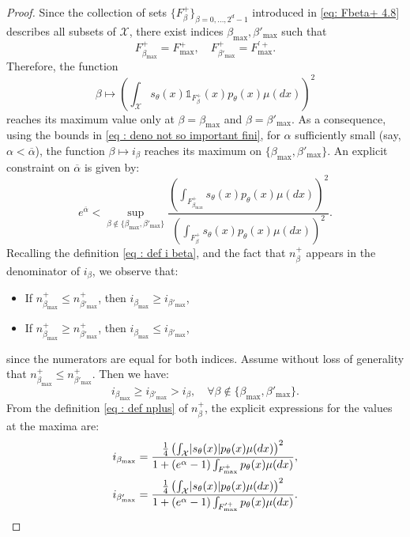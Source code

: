 \documentclass[a4paper, 11pt]{article}
\theoremstyle{definition}
\newcommand{\cX}{{\mathcal{X}}}
\newcommand{\indi}[1]{\mathds{1}_{#1}}
\DeclarePairedDelimiter{\abs}{\lvert}{\rvert}
\begin{document}
{\begin{proof}
Since the collection of sets $\{F^+_\beta\}_{\beta=0,\dots,2^d-1}$ introduced in \eqref{eq: Fbeta+ 4.8} describes all subsets of $\cX$, there exist indices $\beta_\text{max}, \beta'_\text{max}$ such that
\[
F_{\beta_\text{max}}^+ = F_\text{max}^+, \quad 
F_{\beta'_\text{max}}^+ = F_\text{max}^{\prime +}.
\]
Therefore, the function
\[
\beta \mapsto \left( \int_\cX s_\theta(x) \indi{F^+_\beta}(x) p_\theta(x) \mu(dx) \right)^2
\]
reaches its maximum value only at $\beta = \beta_\text{max}$ and $\beta = \beta'_\text{max}$.
As a consequence, using the bounds in \eqref{eq : deno not so important fini}, for $\alpha$ sufficiently small (say, $\alpha < \overline{\alpha}$), the function $\beta \mapsto i_\beta$ reaches its maximum on $\{\beta_\text{max}, \beta'_\text{max}\}$.
An explicit constraint on $\overline{\alpha}$ is given by:
\[
e^{\overline{\alpha}} 
< \sup_{\beta \notin \{\beta_\text{max}, \beta'_\text{max}\}} 
\frac{
	\left( \int_{F^+_{\beta_\text{max}}} s_\theta(x) p_\theta(x) \mu(dx) \right)^2}{
	\left( \int_{F^+_\beta} s_\theta(x) p_\theta(x) \mu(dx) \right)^2}.
\]
Recalling the definition \eqref{eq : def i beta}, and the fact that $n_\beta^+$ appears in the denominator of $i_\beta$, we observe that:
\begin{itemize}
    \item If $n^+_{\beta_{\text{max}}} \leq n^+_{\beta'_{\text{max}}}$, then $i_{\beta_{\text{max}}} \geq i_{\beta'_{\text{max}}}$,
    \item If $n^+_{\beta_{\text{max}}} \geq n^+_{\beta'_{\text{max}}}$, then $i_{\beta_{\text{max}}} \leq i_{\beta'_{\text{max}}}$,
\end{itemize}
since the numerators are equal for both indices. Assume without loss of generality that $n^+_{\beta_{\text{max}}} \le n^+_{\beta'_{\text{max}}}$. Then we have:
\[
i_{\beta_{\text{max}}} \ge i_{\beta'_{\text{max}}} > i_\beta, \quad \forall \beta \notin \{\beta_\text{max}, \beta'_\text{max}\}.
\]
From the definition \eqref{eq : def nplus} of $n_\beta^+$, the explicit expressions for the values at the maxima are:
\begin{equation} \label{eq : explicit i iprime}
	\begin{aligned}
		i_{\beta_{\text{max}}}
		&= \frac{\frac{1}{4} \left( \int_\cX \abs{s_{\theta}(x)} p_\theta(x) \mu(dx) \right)^2}
		{1 + (e^\alpha - 1) \int_{F^+_\text{max}} p_\theta(x) \mu(dx)}, \\
		i_{\beta'_{\text{max}}}
		&= \frac{\frac{1}{4} \left( \int_\cX \abs{s_{\theta}(x)} p_\theta(x) \mu(dx) \right)^2}
		{1 + (e^\alpha - 1) \int_{F^{\prime +}_\text{max}} p_\theta(x) \mu(dx)}.
	\end{aligned}
\end{equation}
 

\end{proof}}
\end{document}
